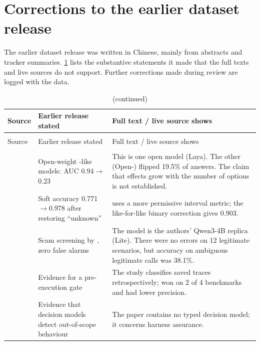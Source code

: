 \section{Corrections to the earlier dataset release}\label{app:E}

The earlier dataset release \cite{survey01} was written in Chinese, mainly from abstracts and tracker summaries. \cref{tab:E1} lists the substantive statements it made that the full texts and live sources do not support. Further corrections made during review are logged with the data.

{\footnotesize
\setlength{\tabcolsep}{4pt}
\renewcommand{\arraystretch}{1.1}
\begin{longtable}{@{}>{\raggedright\arraybackslash}p{1.5cm}>{\raggedright\arraybackslash}p{5.6cm}>{\raggedright\arraybackslash}p{8.4cm}@{}}
\caption{Substantive corrections to the earlier dataset release.}\label{tab:E1}\\
\toprule
Source & Earlier release stated & Full text / live source shows \\
\midrule
\endfirsthead
\caption[]{(continued)}\\
\toprule
Source & Earlier release stated & Full text / live source shows \\
\midrule
\endhead
\midrule
\multicolumn{3}{r}{\emph{continued on next page}}\\
\endfoot
\bottomrule
\endlastfoot
\cite{arx26758} & Open-weight \jev{}-like models: AUC 0.94$\to$0.23 & This is one open model (Laya). The other (Open-\jev{}) flipped 19.5\% of answers. The claim that effects grow with the number of options is not established. \\
\cite{arx35342} & Soft accuracy 0.771$\to$0.978 after restoring ``unknown'' & 0.978 uses a more permissive interval metric; the like-for-like binary correction gives 0.903. \\
\cite{arx23959} & Scam screening by \jev{}, zero false alarms & The model is the authors' Qwen3-4B replica (\jev{}Lite). There were no errors on 12 legitimate scenarios, but accuracy on ambiguous legitimate calls was 38.1\%. \\
\cite{arx34862} & Evidence for a pre-execution gate & The study classifies saved traces retrospectively; \jev{} won on 2 of 4 benchmarks and had lower precision. \\
\cite{arx22664} & Evidence that decision models detect out-of-scope behaviour & The paper contains no typed decision model; it concerns harness assurance. \\

\end{longtable}}
